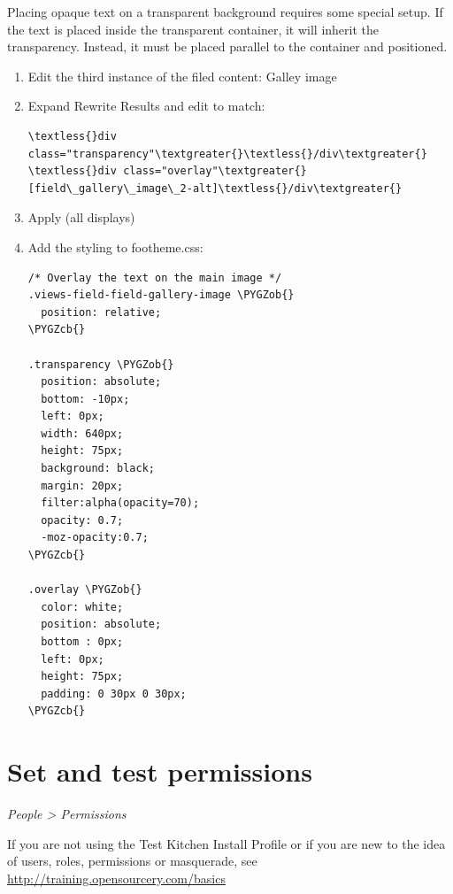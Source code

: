 \documentclass[letterpaper,10pt,english]{sphinxmanual}
\def\PYGZob{\char`\{}
\def\PYGZcb{\char`\}}
\begin{document}
Placing opaque text on a transparent background requires some special setup. If the text is placed inside the transparent container, it will inherit the transparency. Instead, it must be placed parallel to the container and positioned.
\begin{enumerate}
\item {} 
Edit the third instance of the filed content: Galley image

\item {} 
Expand Rewrite Results and edit to match:

\begin{Verbatim}[commandchars=\\\{\}]
\textless{}div class="transparency"\textgreater{}\textless{}/div\textgreater{}
\textless{}div class="overlay"\textgreater{}[field\_gallery\_image\_2-alt]\textless{}/div\textgreater{}
\end{Verbatim}

\item {} 
Apply (all displays)

\item {} 
Add the styling to footheme.css:

\begin{Verbatim}[commandchars=\\\{\}]
/* Overlay the text on the main image */
.views-field-field-gallery-image \PYGZob{}
  position: relative;
\PYGZcb{}

.transparency \PYGZob{}
  position: absolute;
  bottom: -10px;
  left: 0px;
  width: 640px;
  height: 75px;
  background: black;
  margin: 20px;
  filter:alpha(opacity=70);
  opacity: 0.7;
  -moz-opacity:0.7;
\PYGZcb{}

.overlay \PYGZob{}
  color: white;
  position: absolute;
  bottom : 0px;
  left: 0px;
  height: 75px;
  padding: 0 30px 0 30px;
\PYGZcb{}
\end{Verbatim}

\end{enumerate}


\chapter{Set and test permissions}
\label{slideshows:set-and-test-permissions}
\emph{People \textgreater{} Permissions}

If you are not using the Test Kitchen Install Profile or if you are new to the idea of users, roles, permissions or masquerade, see \href{http://training.opensourcery.com/basics}{http://training.opensourcery.com/basics}
\end{document}
